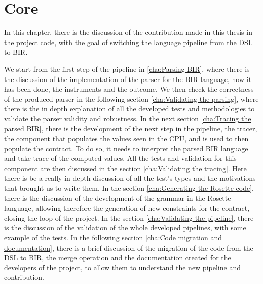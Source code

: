 \chapter{Core}
\label{cha:core} In this chapter, there is the discussion of the contribution
made in this thesis in the project code, with the goal of switching the language
pipeline from the DSL to BIR.

We start from the first step of the pipeline in \ref{cha:Parsing BIR}, where
there is the discussion of the implementation of the parser for the BIR language,
how it has been done, the instruments and the outcome. We then check the correctness
of the produced parser in the following section \ref{cha:Validating the parsing},
where there is the in depth explanation of all the developed tests and
methodologies to validate the parser validity and robustness. In the next section
\ref{cha:Tracing the parsed BIR}, there is the development of the next step in
the pipeline, the tracer, the component that populates the values seen in the
CPU, and is used to then populate the contract. To do so, it needs to interpret the
parsed BIR language and take trace of the computed values. All the tests and
validation for this component are then discussed in the section
\ref{cha:Validating the tracing}. Here there is be a really in-depth discussion of
all the test's types and the motivations that brought us to write them. In the
section \ref{cha:Generating the Rosette code}, there is the discussion of the development
of the grammar in the Rosette language, allowing therefore the generation of new
constraints for the contract, closing the loop of the project. In the section
\ref{cha:Validating the pipeline}, there is the discussion of the validation of the
whole developed pipelines, with some example of the tests. In the following section
\ref{cha:Code migration and documentation}, there is a brief discussion of the
migration of the code from the DSL to BIR, the merge operation and the documentation
created for the developers of the project, to allow them to understand the new
pipeline and contribution.

